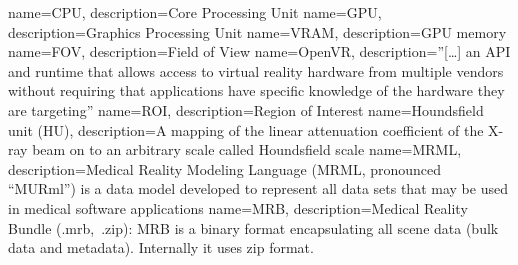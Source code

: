 
\makeglossaries

{
	name=CPU,
	description={Core Processing Unit}
}
{
	name=GPU,
	description={Graphics Processing Unit}
}
{
	name=VRAM,
	description={GPU memory}
}
{
	name=FOV,
	description={Field of View}
}
{
name=OpenVR,
description={''[\ldots] an API and runtime that allows access to virtual reality hardware from multiple vendors without requiring that applications have specific knowledge of the hardware they are targeting''\cite{valvesoftwareOpenVRSDK2024}}
}
{
	name=ROI,
	description={Region of Interest}
}
{
	name=Houndsfield unit (HU),
	description={A mapping of the linear attenuation coefficient of the X-ray beam on to an arbitrary scale called Houndsfield scale\cite{denotterHounsfieldUnit2024}}
}
{
	name=MRML,
	description={Medical Reality Modeling Language (MRML, pronounced “MURml”) is a data model developed to represent all data sets that may be used in medical software applications\cite{kikinis3DSlicerPlatform2014}}
}
{
	name=MRB,
	description={Medical Reality Bundle (.mrb,\ .zip): MRB is a binary format encapsulating all scene data (bulk data and metadata). Internally it uses zip format. \cite{kikinis3DSlicerPlatform2014}}
}

